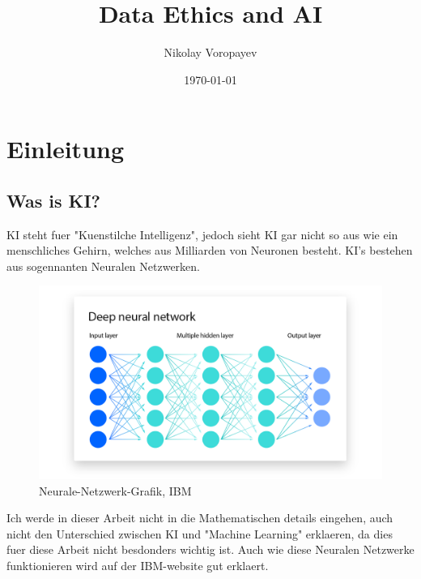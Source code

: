 \documentclass{report}
\title{Data Ethics and AI}
\author{Nikolay Voropayev}
\date{\today}
\begin{document}
\maketitle


\tableofcontents

\chapter{Einleitung}
\section{Was is KI?}
KI steht fuer "Kuenstilche Intelligenz", jedoch sieht KI gar nicht so aus wie ein menschliches Gehirn, welches aus Milliarden von Neuronen besteht.
KI's bestehen aus sogennanten Neuralen Netzwerken. \citep{neural-networks}
\begin{figure}[h]
    \centering 
    \includegraphics[width=1\textwidth]{NN-ibm.png} 
    \caption{Neurale-Netzwerk-Grafik, IBM}
    \label{fig:meme}
\end{figure}
\newline
Ich werde in dieser Arbeit nicht in die Mathematischen details eingehen, auch nicht den Unterschied zwischen KI und "Machine Learning"  erklaeren, da dies fuer diese Arbeit nicht besdonders wichtig ist. Auch wie diese Neuralen Netzwerke funktionieren 
wird auf der IBM-website \citep{ai-ibm} gut erklaert.
\end{document}
